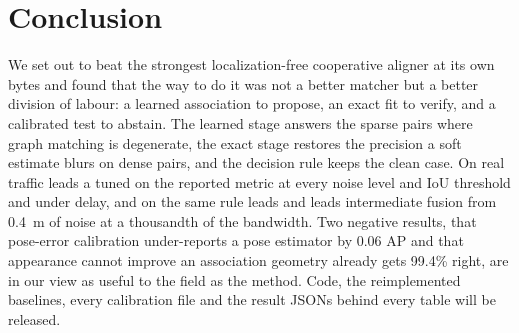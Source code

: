 \section{Conclusion}
\label{sec:conclusion}
We set out to beat the strongest localization-free cooperative aligner at its own bytes and found that the way to do it was not a better matcher but a better division of labour: a learned association to propose, an exact fit to verify, and a calibrated test to abstain. The learned stage answers the sparse pairs where graph matching is degenerate, the exact stage restores the precision a soft estimate blurs on dense pairs, and the decision rule keeps the clean case. On real traffic \paper leads a \freealign tuned on the reported metric at every noise level and IoU threshold and under delay, and on \opvv the same rule leads \freealign and leads intermediate fusion from \SI{0.4}{m} of noise at a thousandth of the bandwidth. Two negative results, that pose-error calibration under-reports a pose estimator by 0.06 AP and that appearance cannot improve an association geometry already gets 99.4\% right, are in our view as useful to the field as the method. Code, the reimplemented baselines, every calibration file and the result JSONs behind every table will be released.
